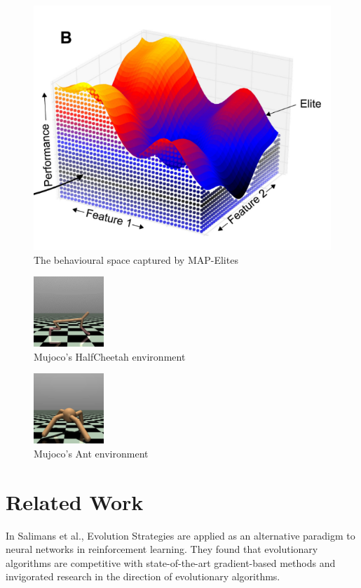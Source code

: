 \documentclass[11pt]{article}
\begin{document}
\begin{figure}[htbp]
\centering
\includegraphics[width=.9\linewidth]{./map-elites.png}
\caption{The behavioural space captured by MAP-Elites}
\end{figure}

\begin{figure}[htbp]
\centering
\includegraphics[width=100px]{./half_cheetah2.png}
\caption{Mujoco's HalfCheetah environment}
\end{figure}

\begin{figure}[htbp]
\centering
\includegraphics[width=100px]{./ant2.png}
\caption{Mujoco's Ant environment}
\end{figure}

\section{Related Work}
\label{sec:org11c1eed}

In Salimans et al., Evolution Strategies are applied as an alternative paradigm to neural networks
in reinforcement learning. They found that evolutionary algorithms are competitive with state-of-the-art
gradient-based methods and invigorated research in the direction of evolutionary algorithms. 
\end{document}
